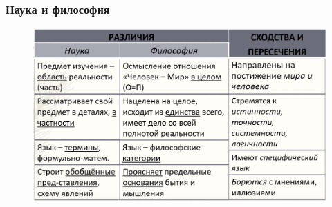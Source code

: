 \subsubsection{Наука и философия} 

\begin{figure}[H]
    \centering
    \includegraphics[width=0.8\linewidth]{pictures/sciphil.png}
    \label{sciphil}
\end{figure}



